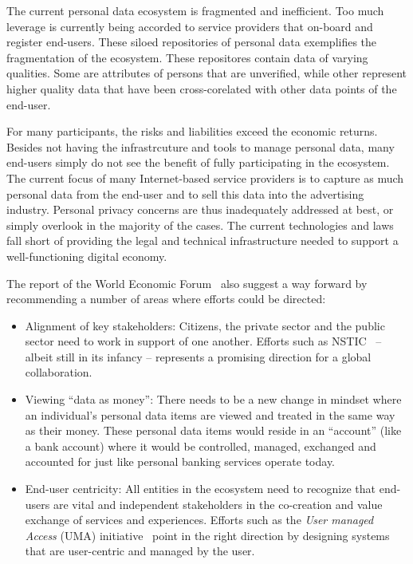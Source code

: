 The current personal data ecosystem is fragmented and inefficient.
Too much leverage is currently being accorded to service providers that on-board
and register end-users.
These siloed repositories of personal data exemplifies the fragmentation of the ecosystem.
These repositores contain data of varying qualities.
Some are attributes of persons that are unverified,
while other represent higher quality data that have been
cross-corelated with other data points of the end-user.

For many participants, the risks and liabilities exceed the economic returns.
Besides not having the infrastrcuture and tools to manage personal data,
many end-users simply do not see the benefit of fully participating in the ecosystem.
The current focus of many Internet-based service providers
is to capture as much personal data from the end-user
and to sell this data into the advertising industry.
Personal privacy concerns are thus inadequately addressed at best,
or simply overlook in the majority of the cases.
The current technologies and laws fall short of providing the 
legal and technical infrastructure needed to support 
a well-functioning digital economy.

The report of the World Economic Forum~\cite{WEF2011}
also suggest a way forward by recommending
a number of areas where efforts could be directed:
\begin{itemize}
\item Alignment of key stakeholders:  
Citizens, the private sector and the public sector
need to work in support of one another.
Efforts such as NSTIC~\cite{NSTIC-reference} -- albeit still in its infancy --
represents a promising direction
for a global collaboration.


\item Viewing ``data as money'':
There needs to be a new change in mindset where
an individual's personal data items are viewed
and treated in the same way as their money.
These personal data items would reside in an ``account'' (like a bank account)
 where it would be controlled, managed, exchanged and 
accounted for just like personal banking services operate today.


\item End-user centricity:  All entities in the ecosystem need to
recognize that end-users are vital and 
independent stakeholders in the co-creation 
and value exchange of services and experiences.
Efforts such as the {\em User managed Access} (UMA) initiative~\cite{UMA-reference}
point in the right direction by designing systems that are
user-centric and managed by the user.


\end{itemize}



